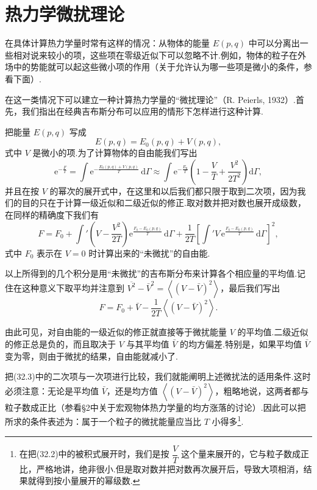 \section{热力学微扰理论}

在具体计算热力学量时常有这样的情况：从物体的能量 $E(p,q)$ 中可以分离出一些相对说来较小的项，这些项在零级近似下可以忽略不计.例如，物体的粒子在外场中的势能就可以起这些微小项的作用（关于允许认为哪一些项是微小的条件，参看下面）.

在这一类情况下可以建立一种计算热力学量的“微扰理论”（R. Peierls, 1932）.首先，我们指出在经典吉布斯分布可以应用的情形下怎样进行这种计算.

把能量 $E(p,q)$ 写成
\begin{equation}
  E(p,q)=E_0(p,q)+V(p,q),
\end{equation}
式中 $V$ 是微小的项.为了计算物体的自由能我们写出
\begin{equation}
  \mathrm{e}^{-\frac{F}{T}}=\int\mathrm{e}^{-\frac{E_0(p,q)+V(p,q)}{T}}\,\mathrm{d}\varGamma
  \approx\int\mathrm{e}^{-\frac{E_0}{T}}\left(1-\frac{V}{T}+\frac{V^2}{2T^2}\right)\mathrm{d}\varGamma,
\end{equation}
并且在按 $V$ 的幂次的展开式中，在这里和以后我们都只限于取到二次项，因为我们的目的只在于计算一级近似和二级近似的修正.取对数并把对数也展开成级数，在同样的精确度下我们有
\begin{equation*}
  F=F_0+\int'\left(V-\frac{V^2}{2T}\right)\mathrm{e}^{\frac{F_0-E_0(p,q)}{T}}\,\mathrm{d}\varGamma
  +\frac{1}{2T}\left[\int'V\,\mathrm{e}^{\frac{F_0-E_0(p,q)}{T}}\,\mathrm{d}\varGamma\right]^2,
\end{equation*}
式中 $F_0$ 表示在 $V=0$ 时计算出来的“未微扰”的自由能.

以上所得到的几个积分是用“未微扰”的吉布斯分布来计算各个相应量的平均值.记住在这种意义下取平均并注意到 $\overline{V^2}-\bar{V}^2=\left\langle(V-\bar{V})^2\right\rangle$，最后我们写出
\begin{equation}
  F=F_0+\bar{V}-\frac{1}{2T}\left\langle(V-\bar{V})^2\right\rangle.
\end{equation}

由此可见，对自由能的一级近似的修正就直接等于微扰能量 $V$ 的平均值.二级近似的修正总是负的，而且取决于 $V$ 与其平均值 $\bar{V}$ 的均方偏差.特别是，如果平均值 $\bar{V}$ 变为零，则由于微扰的结果，自由能就减小了.

把(32.3)中的二次项与一次项进行比较，我们就能阐明上述微扰法的适用条件.这时必须注意：无论是平均值 $\bar{V}$，还是均方值 $\left\langle(V-\bar{V})^2\right\rangle$，粗略地说，这两者都与粒子数成正比（参看§2中关于宏观物体热力学量的均方涨落的讨论）.因此可以把所求的条件表述为：属于一个粒子的微扰能量应当比 $T$ 小得多\footnote{在把(32.2)中的被积式展开时，我们是按 $\dfrac{V}{T}$ 这个量来展开的，它与粒子数成正比，严格地讲，绝非很小.但是取对数并把对数再次展开后，导致大项相消，结果就得到按小量展开的幂级数.}.

